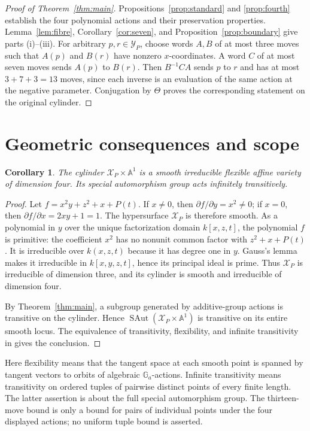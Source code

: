 \documentclass[11pt,letterpaper]{article}
\newcommand{\A}{\mathbb A}
\newcommand{\Ga}{\mathbb G_a}
\newcommand{\SAut}{\operatorname{SAut}}
\newcommand{\Y}{\mathcal Y_P}
\newcommand{\X}{\mathcal X_P}
\newtheorem{corollary}[theorem]{Corollary}
\theoremstyle{remark}
\begin{document}
\begin{proof}[Proof of Theorem~\ref{thm:main}]
Propositions~\ref{prop:standard} and \ref{prop:fourth} establish the four polynomial actions and their preservation properties. Lemma~\ref{lem:fibre}, Corollary~\ref{cor:seven}, and Proposition~\ref{prop:boundary} give parts \textup{(i)--(iii)}. For arbitrary $p,r\in\Y$, choose words $A,B$ of at most three moves such that $A(p)$ and $B(r)$ have nonzero $x$-coordinates. A word $C$ of at most seven moves sends $A(p)$ to $B(r)$. Then $B^{-1}CA$ sends $p$ to $r$ and has at most $3+7+3=13$ moves, since each inverse is an evaluation of the same action at the negative parameter. Conjugation by $\Theta$ proves the corresponding statement on the original cylinder.
\end{proof}

\section{Geometric consequences and scope}\label{sec:geometry}

\begin{corollary}\label{cor:flexible}
The cylinder $\X\times\A^1$ is a smooth irreducible flexible affine variety of dimension four. Its special automorphism group acts infinitely transitively.
\end{corollary}

\begin{proof}
Let $f=x^2y+z^2+x+P(t)$. If $x\ne0$, then $\partial f/\partial y=x^2\ne0$; if $x=0$, then $\partial f/\partial x=2xy+1=1$. The hypersurface $\X$ is therefore smooth. As a polynomial in $y$ over the unique factorization domain $k[x,z,t]$, the polynomial $f$ is primitive: the coefficient $x^2$ has no nonunit common factor with $z^2+x+P(t)$. It is irreducible over $k(x,z,t)$ because it has degree one in $y$. Gauss's lemma makes it irreducible in $k[x,y,z,t]$, hence its principal ideal is prime. Thus $\X$ is irreducible of dimension three, and its cylinder is smooth and irreducible of dimension four.

By Theorem~\ref{thm:main}, a subgroup generated by additive-group actions is transitive on the cylinder. Hence $\SAut(\X\times\A^1)$ is transitive on its entire smooth locus. The equivalence of transitivity, flexibility, and infinite transitivity in \cite[Theorem~0.1]{AFKKZ} gives the conclusion.
\end{proof}

Here flexibility means that the tangent space at each smooth point is spanned by tangent vectors to orbits of algebraic $\Ga$-actions. Infinite transitivity means transitivity on ordered tuples of pairwise distinct points of every finite length. The latter assertion is about the full special automorphism group. The thirteen-move bound is only a bound for pairs of individual points under the four displayed actions; no uniform tuple bound is asserted.
\end{document}
